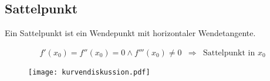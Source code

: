 \subsection{Sattelpunkt}
Ein Sattelpunkt ist ein Wendepunkt mit horizontaler Wendetangente.

\[ \boxed{ \begin{matrix}
f'(x_0) =  f''(x_0) = 0 \land f'''(x_0) \neq 0 & \Rightarrow 
& \text{Sattelpunkt in $x_0$}
\end{matrix} } \]

\begin{figure}[h!]
\centering
\texttt{[image: kurvendiskussion.pdf]}
\end{figure}
